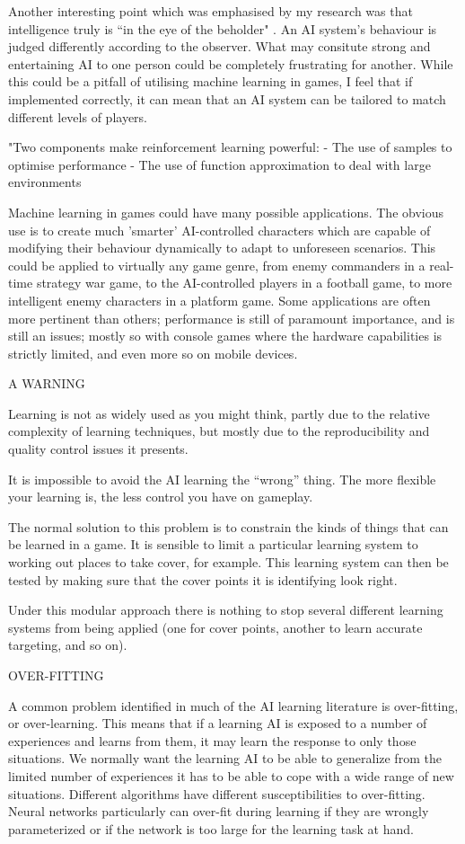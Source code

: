 \documentclass[a4paper,oneside]{report}
\begin{document}
Another interesting point which was emphasised by my research was that intelligence truly is ``in the eye of the beholder" \cite{:hc}. An AI system's behaviour is judged differently according to the observer. What may consitute strong and entertaining AI to one person could be completely frustrating for another. While this could be a pitfall of utilising machine learning in games, I feel that if implemented correctly, it can mean that an AI system can be tailored to match different levels of players.

"Two components make reinforcement learning powerful: 
-	The use of samples to optimise performance 
-	The use of function approximation to deal with large environments

Machine learning in games could have many possible applications. The obvious use is to create much 'smarter' AI-controlled characters which are capable of modifying their behaviour dynamically to adapt to unforeseen scenarios. This could be applied to virtually any game genre, from enemy commanders in a real-time strategy war game, to the AI-controlled players in a football game, to more intelligent enemy characters in a platform game. Some applications are often more pertinent than others; performance is still of paramount importance, and is still an issues; mostly so with console games where the hardware capabilities is strictly limited, and even more so on mobile devices.

A WARNING

Learning is not as widely used as you might think, partly due to the relative complexity of learning techniques, but mostly due to the reproducibility and quality control issues it presents.

It is impossible to avoid the AI learning the “wrong” thing. The more flexible your learning is, the less control you have on gameplay.

The normal solution to this problem is to constrain the kinds of things that can be learned in a game. It is sensible to limit a particular learning system to working out places to take cover, for example. This learning system can then be tested by making sure that the cover points it is identifying look right.

Under this modular approach there is nothing to stop several different learning systems from being applied (one for cover points, another to learn accurate targeting, and so on).

OVER-FITTING

A common problem identified in much of the AI learning literature is over-fitting, or over-learning. This means that if a learning AI is exposed to a number of experiences and learns from them, it may learn the response to only those situations. We normally want the learning AI to be able to generalize from the limited number of experiences it has to be able to cope with a wide range of new situations.
Different algorithms have different susceptibilities to over-fitting. Neural networks particularly can over-fit during learning if they are wrongly parameterized or if the network is too large for the learning task at hand.
\end{document}
